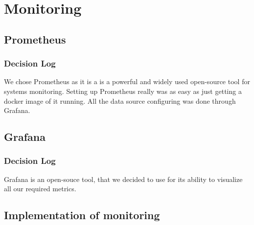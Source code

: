 \section{Monitoring}
\subsection{Prometheus}
\subsubsection{Decision Log}

We chose Prometheus as it is a is a powerful and widely used open-source tool for systems monitoring.
Setting up Prometheus really was as easy as just getting a docker image of it running.
All the data source configuring was done through Grafana.%

\subsection{Grafana}

\subsubsection{Decision Log}

Grafana is an open-souce tool, that we decided to use for its ability to visualize all our required metrics. %


\subsection{Implementation of monitoring}


